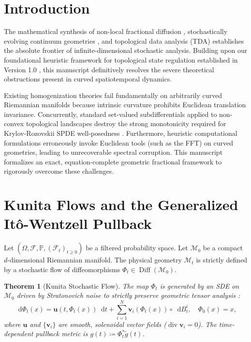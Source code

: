 \documentclass[11pt,a4paper]{article}
\newcommand*{\diff}{\mathop{}\!\mathrm{d}}
\newcommand*{\Prob}{\mathbb{P}}
\newcommand*{\M}{\mathcal{M}}
\DeclareMathOperator{\divop}{div}
\DeclareMathOperator{\Diff}{Diff}
\theoremstyle{plain}
\newtheorem{theorem}{Theorem}[section]
\theoremstyle{definition}
\theoremstyle{remark}
\begin{document}
\section{Introduction}
The mathematical synthesis of non-local fractional diffusion \cite{Lischke2020}, stochastically evolving continuum geometries \cite{Elworthy1982, Kunita1990}, and topological data analysis (TDA) \cite{Carlsson2009} establishes the absolute frontier of infinite-dimensional stochastic analysis. Building upon our foundational heuristic framework for topological state regulation established in Version 1.0 \cite{Ananda2026_V1}, this manuscript definitively resolves the severe theoretical obstructions present in curved spatiotemporal dynamics.

Existing homogenization theories \cite{Bensoussan1978, Jikov1994} fail fundamentally on arbitrarily curved Riemannian manifolds because intrinsic curvature prohibits Euclidean translation invariance. Concurrently, standard set-valued subdifferentials \cite{Clarke1983} applied to non-convex topological landscapes destroy the strong monotonicity required for Krylov-Rozovskii SPDE well-posedness \cite{Krylov1981, Prevot2007}. Furthermore, heuristic computational formulations erroneously invoke Euclidean tools (such as the FFT) on curved geometries, leading to unrecoverable spectral corruption. This manuscript formalizes an exact, equation-complete geometric fractional framework to rigorously overcome these challenges.

\section{Kunita Flows and the Generalized It\^{o}-Wentzell Pullback}
Let $(\Omega, \mathcal{F}, \Prob, (\mathcal{F}_t)_{t \ge 0})$ be a filtered probability space. Let $\M_0$ be a compact $d$-dimensional Riemannian manifold. The physical geometry $\M_t$ is strictly defined by a stochastic flow of diffeomorphisms $\Phi_t \in \Diff(\M_0)$.

\begin{theorem}[Kunita Stochastic Flow]
The map $\Phi_t$ is generated by an SDE on $\M_0$ driven by Stratonovich noise to strictly preserve geometric tensor analysis \cite{Kunita1990}:
\begin{equation}
    \diff \Phi_t(x) = \mathbf{u}(t, \Phi_t(x)) \diff t + \sum_{i=1}^N \mathbf{v}_i(\Phi_t(x)) \circ \diff B_t^i, \quad \Phi_0(x) = x,
\end{equation}
where $\mathbf{u}$ and $\{\mathbf{v}_i\}$ are smooth, solenoidal vector fields ($\divop \mathbf{v}_i = 0$). The time-dependent pullback metric is $g(t) \coloneqq \Phi_t^* \tilde{g}(t)$.
\end{theorem}
\end{document}

